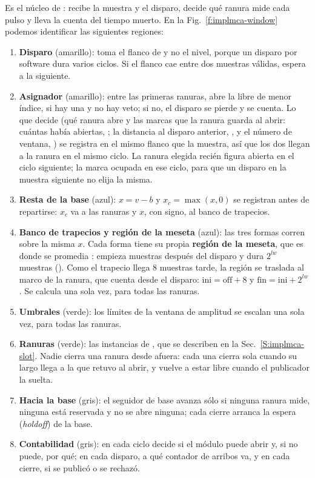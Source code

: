 Es el núcleo de : recibe la muestra y el disparo,
decide qué ranura mide cada pulso y lleva la cuenta del tiempo muerto. En la
Fig.~\ref{f:implmca-window} podemos identificar las siguientes regiones:
\begin{enumerate}
  \item \textbf{Disparo} (amarillo): toma el flanco de  y no el
    nivel, porque un disparo por software dura varios ciclos. Si el flanco cae
    entre dos muestras válidas, espera a la siguiente.
  \item \textbf{Asignador} (amarillo): entre las  primeras
    ranuras, abre la libre de menor índice, si hay una y no hay veto; si no, el
    disparo se pierde y se cuenta. Lo que decide (qué ranura abre y las marcas
    que la ranura guarda al abrir: cuántas había abiertas, ; la
    distancia al disparo anterior, , y el número de ventana,
    ) se registra en el mismo flanco que la muestra, así que los
    dos llegan a la ranura en el mismo ciclo. La ranura elegida recién figura
    abierta en el ciclo siguiente;  la marca ocupada en ese
    ciclo, para que un disparo en la muestra siguiente no elija la misma.
  \item \textbf{Resta de la base} (azul): $x = v - b$ y $x_c = \max(x, 0)$ se
    registran antes de repartirse: $x_c$ va a las ranuras y $x$, con signo, al
    banco de trapecios.
  \item \textbf{Banco de trapecios y región de la meseta} (azul): las tres
    formas corren sobre la misma $x$. Cada forma tiene su propia \textbf{región
    de la meseta}, que es donde se promedia : empieza
     muestras después del disparo y dura $2^{lw}$
    muestras (). Como el trapecio llega 8 muestras tarde,
    la región se traslada al marco de la ranura, que cuenta desde el disparo:
    $\text{ini} = \text{off} + 8$ y $\text{fin} = \text{ini} + 2^{lw}$. Se
    calcula una sola vez, para todas las ranuras.
  \item \textbf{Umbrales} (verde): los límites de la ventana de amplitud se
    escalan una sola vez, para todas las ranuras.
  \item \textbf{Ranuras} (verde): las  instancias de
    , que se describen en la Sec.~\ref{S:implmca-slot}. Nadie
    cierra una ranura desde afuera: cada una cierra sola cuando su largo llega a
    la  que retuvo al abrir, y vuelve a estar libre cuando el
    publicador la suelta.
  \item \textbf{Hacia la base} (gris): el seguidor de base avanza sólo si
    ninguna ranura mide, ninguna está reservada y no se abre ninguna; cada
    cierre arranca la espera (\emph{holdoff}) de la base.
  \item \textbf{Contabilidad} (gris): en cada ciclo decide si el módulo puede
    abrir y, si no puede, por qué; en cada disparo, a qué contador de arribos
    va, y en cada cierre, si se publicó o se rechazó.
\end{enumerate}

